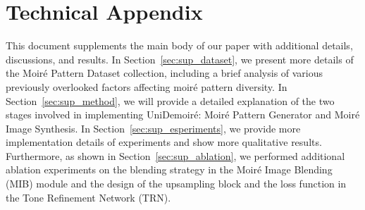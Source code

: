\appendix
\setcounter{secnumdepth}{2} %
\section*{Technical Appendix}
\label{sec:sup_outline}

This document supplements the main body of our paper with additional details, discussions, and results. In Section~\ref{sec:sup_dataset}, we present more details of the Moiré Pattern Dataset collection, including a brief analysis of various previously overlooked factors affecting moiré pattern diversity. In Section~\ref{sec:sup_method}, we will provide a detailed explanation of the two stages involved in implementing UniDemoiré: Moiré Pattern Generator and Moiré Image Synthesis. In Section~\ref{sec:sup_esperiments}, we provide more implementation details of experiments and show more qualitative results. Furthermore, as shown in Section~\ref{sec:sup_ablation}, we performed additional ablation experiments on the blending strategy in the Moiré Image Blending (MIB) module and the design of the upsampling block and the loss function in the Tone Refinement Network (TRN).

